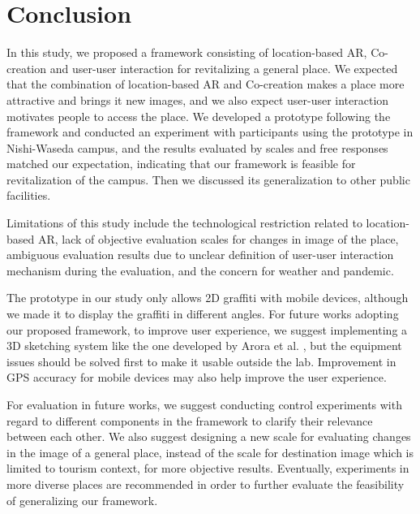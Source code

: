 \chapter{Conclusion}\label{ch:7}

In this study, we proposed a framework consisting of location-based AR, Co-creation and user-user interaction for revitalizing a general place.
We expected that the combination of location-based AR and Co-creation makes a place more attractive and brings it new images, and we also expect user-user interaction motivates people to access the place.
We developed a prototype following the framework and conducted an experiment with participants using the prototype in Nishi-Waseda campus, and the results evaluated by scales and free responses matched our expectation,
indicating that our framework is feasible for revitalization of the campus.
Then we discussed its generalization to other public facilities.

Limitations of this study include the technological restriction related to location-based AR, lack of objective evaluation scales for changes in image of the place,
ambiguous evaluation results due to unclear definition of user-user interaction mechanism during the evaluation, and the concern for weather and pandemic.

The prototype in our study only allows 2D graffiti with mobile devices, although we made it to display the graffiti in different angles.
For future works adopting our proposed framework, to improve user experience, we suggest implementing a 3D sketching system like the one developed by Arora et al. \cite{arora_habib_kazi_grossman_fitzmaurice_singh_2018}, but the equipment issues should be solved first to make it usable outside the lab.
Improvement in GPS accuracy for mobile devices may also help improve the user experience.

For evaluation in future works, we suggest conducting control experiments with regard to different components in the framework to clarify their relevance between each other.
We also suggest designing a new scale for evaluating changes in the image of a general place, instead of the scale for destination image which is limited to tourism context, for more objective results.
Eventually, experiments in more diverse places are recommended in order to further evaluate the feasibility of generalizing our framework.